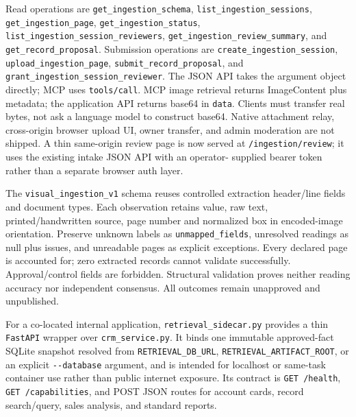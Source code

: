 \documentclass[
]{article}
\begin{document}
Read operations are
\texttt{get\_\allowbreak{}ingestion\_\allowbreak{}schema},
\texttt{list\_\allowbreak{}ingestion\_\allowbreak{}sessions},
\texttt{get\_\allowbreak{}ingestion\_\allowbreak{}page},
\texttt{get\_\allowbreak{}ingestion\_\allowbreak{}status},
\texttt{list\_\allowbreak{}ingestion\_\allowbreak{}session\_\allowbreak{}reviewers},
\texttt{get\_\allowbreak{}ingestion\_\allowbreak{}review\_\allowbreak{}summary},
and \texttt{get\_\allowbreak{}record\_\allowbreak{}proposal}. Submission
operations are
\texttt{create\_\allowbreak{}ingestion\_\allowbreak{}session},
\texttt{upload\_\allowbreak{}ingestion\_\allowbreak{}page},
\texttt{submit\_\allowbreak{}record\_\allowbreak{}proposal}, and
\texttt{grant\_\allowbreak{}ingestion\_\allowbreak{}session\_\allowbreak{}reviewer}.
The JSON API takes the argument object directly; MCP uses
\texttt{tools/\allowbreak{}call}. MCP image retrieval returns
ImageContent plus metadata; the application API returns base64 in
\texttt{data}. Clients must transfer real bytes, not ask a language
model to construct base64. Native attachment relay, cross-origin browser
upload UI, owner transfer, and admin moderation are not shipped. A thin
same-origin review page is now served at
\texttt{/\allowbreak{}ingestion/\allowbreak{}review}; it uses the
existing intake JSON API with an operator- supplied bearer token rather
than a separate browser auth layer.

The \texttt{visual\_\allowbreak{}ingestion\_\allowbreak{}v1} schema
reuses controlled extraction header/line fields and document types. Each
observation retains value, raw text, printed/handwritten source, page
number and normalized box in encoded-image orientation. Preserve unknown
labels as \texttt{unmapped\_\allowbreak{}fields}, unresolved readings as
null plus issues, and unreadable pages as explicit exceptions. Every
declared page is accounted for; zero extracted records cannot validate
successfully. Approval/control fields are forbidden. Structural
validation proves neither reading accuracy nor independent consensus.
All outcomes remain unapproved and unpublished.

For a co-located internal application,
\texttt{retrieval\_\allowbreak{}sidecar.py} provides a thin
\texttt{FastAPI} wrapper over \texttt{crm\_\allowbreak{}service.py}. It
binds one immutable approved-fact SQLite snapshot resolved from
\texttt{RETRIEVAL\_\allowbreak{}DB\_\allowbreak{}URL},
\texttt{RETRIEVAL\_\allowbreak{}ARTIFACT\_\allowbreak{}ROOT}, or an
explicit \texttt{-\/-database} argument, and is intended for localhost
or same-task container use rather than public internet exposure. Its
contract is \texttt{GET /\allowbreak{}health},
\texttt{GET /\allowbreak{}capabilities}, and POST JSON routes for
account cards, record search/query, sales analysis, and standard
reports.
\end{document}
